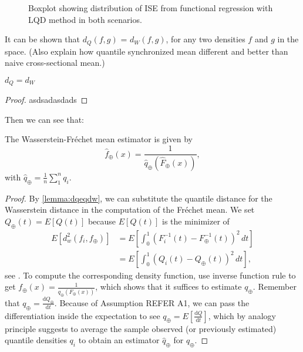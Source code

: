 \begin{figure}[h]
    \centering
    \resizebox{\textwidth}{!}{}
    \caption[Simulation results: boxplot ISE functional regression]{Boxplot showing
    distribution of ISE from functional regression with LQD method in both scenarios.}
    \label{fig:ise_func_reg_both}
\end{figure}


It can be shown that $d_Q(f,g)$ = $d_W(f,g)$, for any two densities $f$ and $g$ in the
space. (Also explain how quantile synchronized mean different and better than naive
cross-sectional mean.)
\begin{lemma}
    \label{lemma:dqeqdw}
    $d_Q = d_W$
\end{lemma}
\begin{proof}
    asdsadasdads
\end{proof}

Then we can see that:
\begin{lemma}
    The Wasserstein-Fréchet mean estimator is given by
    \begin{equation}
        \hat{f}_\oplus(x) = \frac{1}{\hat{q}_\oplus(\hat{F}_\oplus(x))},
    \end{equation}
    with $\hat{q}_\oplus = \frac{1}{n} \sum_{1}^{n} q_i$.
\end{lemma}
\begin{proof}
    By \ref{lemma:dqeqdw}, we can substitute the quantile distance for the
    Wasserstein distance in the computation of the Fréchet mean. We set
    $Q_\oplus(t) = E[Q(t)]$ because $E[Q(t)]$ is the minimizer of
    \begin{equation}
    \label{eq:wf_mean}
        \begin{aligned}
            E[d_w^2(f_i, f_\oplus)]	& =
            E\left[\int_{0}^{1}(F_i^{-1}(t) - F_\oplus^{-1}(t))^2 \,dt\right] \\
                                    & =
            E\left[\int_{0}^{1}(Q_i(t) - Q_\oplus(t))^2 \,dt\right],
        \end{aligned}
    \end{equation}
    see \citet[Chapter~3.1.4]{PanaretosZemel2020}. To compute the corresponding density
    function, use inverse function rule to get
    $f_\oplus(x) = \frac{1}{q_\oplus(F_\oplus(x))}$, which shows that it suffices to
    estimate $q_\oplus$. Remember that
    $q_\oplus = \frac{\mathrm{d}Q_\oplus}{\mathrm{d}t}$. Because of Assumption REFER A1,
    we can pass the differentiation inside the expectation to see
    $q_\oplus = E\left[\frac{\mathrm{d}Q}{\mathrm{d}t}\right]$, which by analogy
    principle suggests to average the sample observed (or previously estimated)
    quantile densities $q_i$ to obtain an estimator $\hat{q}_\oplus$ for $q_\oplus$.
\end{proof}

